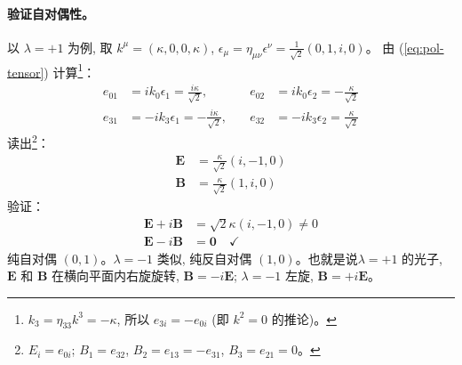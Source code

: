 \paragraph*{验证自对偶性。}
以 $\lambda=+1$ 为例, 取 $k^\mu=(\kappa,0,0,\kappa)$,
$\epsilon_\mu=\eta_{\mu\nu}\epsilon^\nu=\frac{1}{\sqrt{2}}(0,1,i,0)$。
由 (\ref{eq:pol-tensor}) 计算\footnote{%
$k_3=\eta_{33}k^3=-\kappa$, 所以 $e_{3i}=-e_{0i}$
(即 $k^2=0$ 的推论)。}：
\begin{subequations}\label{eq:e-components}
\begin{align}
    e_{01} &= ik_0\epsilon_1 = \tfrac{i\kappa}{\sqrt{2}}, &\quad
    e_{02} &= ik_0\epsilon_2 = -\tfrac{\kappa}{\sqrt{2}} \\
    e_{31} &= -ik_3\epsilon_1 = -\tfrac{i\kappa}{\sqrt{2}}, &\quad
    e_{32} &= -ik_3\epsilon_2 = \tfrac{\kappa}{\sqrt{2}}
\end{align}
\end{subequations}
读出\footnote{%
$E_i=e_{0i}$; $B_1=e_{32}$, $B_2=e_{13}=-e_{31}$, $B_3=e_{21}=0$。}：
\begin{subequations}\label{eq:EB-from-pol}
\begin{align}
    \boldsymbol{E} &= \tfrac{\kappa}{\sqrt{2}}(i,-1,0) \\
    \boldsymbol{B} &= \tfrac{\kappa}{\sqrt{2}}(1,i,0)
\end{align}
\end{subequations}
验证：
\begin{subequations}\label{eq:self-dual-check}
\begin{align}
    \boldsymbol{E}+i\boldsymbol{B} &= \sqrt{2}\kappa(i,-1,0) \neq 0 \\
    \boldsymbol{E}-i\boldsymbol{B} &= \boldsymbol{0} \quad\checkmark
\end{align}
\end{subequations}
纯自对偶 $(0,1)$。$\lambda=-1$ 类似, 纯反自对偶 $(1,0)$。也就是说$\lambda=+1$ 的光子, 
$\boldsymbol{E}$ 和 $\boldsymbol{B}$ 在横向平面内右旋旋转,
$\boldsymbol{B}=-i\boldsymbol{E}$; 
$\lambda=-1$ 左旋, $\boldsymbol{B}=+i\boldsymbol{E}$。


